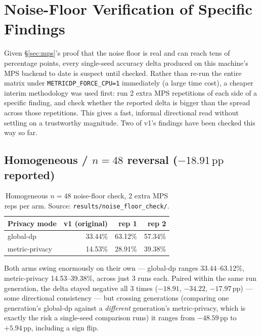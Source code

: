 \documentclass[11pt]{article}
\newcommand{\code}[1]{\texttt{#1}}
\newcommand{\pp}{\,\text{pp}}
\begin{document}
\section{Noise-Floor Verification of Specific Findings}
\label{sec:noisefloor}

Given \S\ref{sec:mps}'s proof that the noise floor is real and can reach tens of percentage points,
every single-seed accuracy delta produced on this machine's MPS backend to date is suspect until
checked. Rather than re-run the entire matrix under \code{METRICDP\_FORCE\_CPU=1} immediately (a
large time cost), a cheaper interim methodology was used first: run 2 extra MPS repetitions of each
side of a specific finding, and check whether the reported delta is bigger than the spread across
those repetitions. This gives a fast, informal directional read without settling on a trustworthy
magnitude. Two of v1's findings have been checked this way so far.

\subsection{Homogeneous / $n{=}48$ reversal ($-18.91\pp$ reported)}

\begin{table}[h]
\centering
\small
\begin{tabular}{lrrr}
\toprule
Privacy mode & v1 (original) & rep 1 & rep 2 \\
\midrule
global-dp        & 33.44\% & 63.12\% & 57.34\% \\
metric-privacy   & 14.53\% & 28.91\% & 39.38\% \\
\bottomrule
\end{tabular}
\caption{Homogeneous $n{=}48$ noise-floor check, 2 extra MPS reps per arm.
Source: \code{results/noise\_floor\_check/}.}
\label{tab:noisefloor-hom}
\end{table}

Both arms swing enormously on their own --- global-dp ranges 33.44--63.12\%, metric-privacy
14.53--39.38\%, across just 3 runs each. Paired within the same run generation, the delta stayed
negative all 3 times ($-18.91$, $-34.22$, $-17.97\pp$) --- some directional consistency --- but
crossing generations (comparing one generation's global-dp against a \emph{different} generation's
metric-privacy, which is exactly the risk a single-seed comparison runs) it ranges from
$-48.59\pp$ to $+5.94\pp$, including a sign flip.
\end{document}
